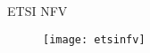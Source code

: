 \begin{frame}{ETSI NFV}
  \begin{figure}
    \centering
    \texttt{[image: etsinfv]}
  \end{figure}
\end{frame}